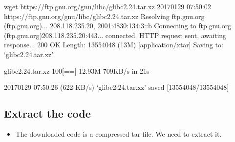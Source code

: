 \documentclass[letterpaper,10pt,english]{sphinxmanual}
\begin{document}
\begin{sphinxVerbatim}[commandchars=\\\{\}]
\PYGZdl{} wget https://ftp.gnu.org/gnu/libc/glibc\PYGZhy{}2.24.tar.xz
\PYGZhy{}\PYGZhy{}2017\PYGZhy{}01\PYGZhy{}29 07:50:02\PYGZhy{}\PYGZhy{}  https://ftp.gnu.org/gnu/libc/glibc\PYGZhy{}2.24.tar.xz
Resolving ftp.gnu.org (ftp.gnu.org)... 208.118.235.20, 2001:4830:134:3::b
Connecting to ftp.gnu.org (ftp.gnu.org)\textbar{}208.118.235.20\textbar{}:443... connected.
HTTP request sent, awaiting response... 200 OK
Length: 13554048 (13M) [application/x\PYGZhy{}tar]
Saving to: ‘glibc\PYGZhy{}2.24.tar.xz’

glibc\PYGZhy{}2.24.tar.xz                     100\PYGZpc{}[==\PYGZgt{}]  12.93M   709KB/s    in 21s

2017\PYGZhy{}01\PYGZhy{}29 07:50:26 (622 KB/s) \PYGZhy{} ‘glibc\PYGZhy{}2.24.tar.xz’ saved [13554048/13554048]
\end{sphinxVerbatim}


\subsection{Extract the code}
\label{\detokenize{03_glibc:extract-the-code}}\begin{itemize}
\item {} 
The downloaded code is a compressed tar file. We need to extract it.

\end{itemize}
\end{document}
